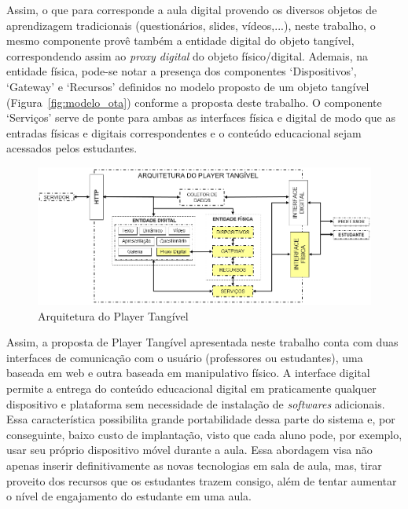 Assim, o que para \cite{leitao:2017} corresponde a aula digital provendo os diversos objetos de aprendizagem tradicionais (questionários, slides, vídeos,...), neste trabalho, o mesmo componente provê também a entidade digital do objeto tangível, correspondendo assim ao \textit{proxy digital} do objeto físico/digital. Ademais, na entidade física, pode-se notar a presença dos componentes `Dispositivos', `Gateway' e `Recursos' definidos no modelo proposto de um objeto tangível (Figura~\ref{fig:modelo_ota}) conforme a proposta deste trabalho. O componente `Serviços' serve de ponte para ambas as interfaces física e digital de modo que as entradas físicas e digitais correspondentes e o conteúdo educacional sejam acessados pelos estudantes.



\begin{figure}[htb]
	\centering
	\includegraphics[width=1\linewidth]{chapters/proposedMethod/arquitetura_player.png}
	\caption{Arquitetura do Player Tangível}
	\label{fig:arquiteturaplayer}
\end{figure}

Assim, a proposta de Player Tangível apresentada neste trabalho conta com duas interfaces de comunicação com o usuário (professores ou estudantes), uma baseada em web e outra baseada em manipulativo físico. A interface digital permite a entrega do conteúdo educacional digital em praticamente qualquer dispositivo e plataforma sem necessidade de instalação de \textit{softwares} adicionais. Essa característica possibilita grande portabilidade dessa parte do sistema e, por conseguinte, baixo custo de implantação, visto que cada aluno pode, por exemplo, usar seu próprio dispositivo móvel durante a aula. Essa abordagem visa não apenas inserir definitivamente as novas tecnologias em sala de aula, mas, tirar proveito dos recursos que os estudantes trazem consigo, além de tentar aumentar o nível de engajamento do estudante em uma aula.

